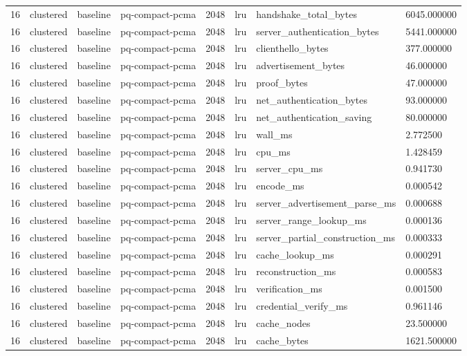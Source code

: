 \begin{tabular}{llllllll}
16 & clustered & baseline & pq-compact-pcma & 2048 & lru & handshake\_total\_bytes & 6045.000000 \\
16 & clustered & baseline & pq-compact-pcma & 2048 & lru & server\_authentication\_bytes & 5441.000000 \\
16 & clustered & baseline & pq-compact-pcma & 2048 & lru & clienthello\_bytes & 377.000000 \\
16 & clustered & baseline & pq-compact-pcma & 2048 & lru & advertisement\_bytes & 46.000000 \\
16 & clustered & baseline & pq-compact-pcma & 2048 & lru & proof\_bytes & 47.000000 \\
16 & clustered & baseline & pq-compact-pcma & 2048 & lru & net\_authentication\_bytes & 93.000000 \\
16 & clustered & baseline & pq-compact-pcma & 2048 & lru & net\_authentication\_saving & 80.000000 \\
16 & clustered & baseline & pq-compact-pcma & 2048 & lru & wall\_ms & 2.772500 \\
16 & clustered & baseline & pq-compact-pcma & 2048 & lru & cpu\_ms & 1.428459 \\
16 & clustered & baseline & pq-compact-pcma & 2048 & lru & server\_cpu\_ms & 0.941730 \\
16 & clustered & baseline & pq-compact-pcma & 2048 & lru & encode\_ms & 0.000542 \\
16 & clustered & baseline & pq-compact-pcma & 2048 & lru & server\_advertisement\_parse\_ms & 0.000688 \\
16 & clustered & baseline & pq-compact-pcma & 2048 & lru & server\_range\_lookup\_ms & 0.000136 \\
16 & clustered & baseline & pq-compact-pcma & 2048 & lru & server\_partial\_construction\_ms & 0.000333 \\
16 & clustered & baseline & pq-compact-pcma & 2048 & lru & cache\_lookup\_ms & 0.000291 \\
16 & clustered & baseline & pq-compact-pcma & 2048 & lru & reconstruction\_ms & 0.000583 \\
16 & clustered & baseline & pq-compact-pcma & 2048 & lru & verification\_ms & 0.001500 \\
16 & clustered & baseline & pq-compact-pcma & 2048 & lru & credential\_verify\_ms & 0.961146 \\
16 & clustered & baseline & pq-compact-pcma & 2048 & lru & cache\_nodes & 23.500000 \\
16 & clustered & baseline & pq-compact-pcma & 2048 & lru & cache\_bytes & 1621.500000 \\

\end{tabular}
